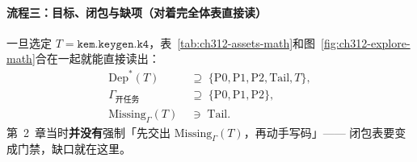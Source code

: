 \documentclass[UTF8,a4paper,11pt]{ctexart}
\theoremstyle{definition}
\theoremstyle{plain}
\theoremstyle{remark}
\numberwithin{figure}{section}
\numberwithin{table}{section}
\begin{document}
\paragraph{流程三：目标、闭包与缺项（对着完全体表直接读）}
一旦选定 $T=\texttt{kem.keygen.k4}$，表~\ref{tab:ch312-assets-math}和图~\ref{fig:ch312-explore-math}合在一起就能直接读出：
\begin{align*}
\mathrm{Dep}^*(T)
&\;\supseteq\;
\{\mathrm{P0},\mathrm{P1},\mathrm{P2},\mathrm{Tail},T\},\\
\Gamma_{\text{开任务}}
&\;\supseteq\;
\{\mathrm{P0},\mathrm{P1},\mathrm{P2}\},\\
\mathrm{Missing}_{\Gamma}(T)
&\;\ni\;
\mathrm{Tail}.
\end{align*}
第~2~章当时\textbf{并没有}强制「先交出 $\mathrm{Missing}_\Gamma(T)$，再动手写码」——
闭包表要变成门禁，缺口就在这里。
\end{document}
